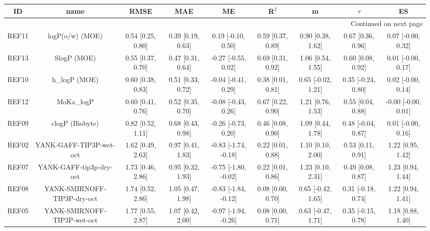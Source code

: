\documentclass{article}
\begin{document}
\begin{center}
\scriptsize
\begin{longtable}{|ccccccccc|}
\toprule
    ID &                            name &               RMSE &                MAE &                    ME &              R$^2$ &                   m &              $\tau$ &                   ES \\
\midrule
\endhead
\midrule
\multicolumn{9}{r}{{Continued on next page}} \\
\midrule
\endfoot

\bottomrule
\endlastfoot
 REF11 &                 logP(o/w) (MOE) &  0.54 [0.25, 0.80] &  0.39 [0.19, 0.63] &    0.19 [-0.10, 0.50] &  0.59 [0.37, 0.89] &   0.90 [0.38, 1.62] &   0.67 [0.36, 0.96] &   0.07 [-0.00, 0.32] \\
 REF13 &                     SlogP (MOE) &  0.55 [0.37, 0.70] &  0.47 [0.31, 0.64] &   -0.27 [-0.55, 0.02] &  0.69 [0.31, 0.92] &   1.06 [0.54, 1.55] &   0.60 [0.08, 0.92] &   0.01 [-0.00, 0.17] \\
 REF10 &                   h\_logP (MOE) &  0.60 [0.38, 0.83] &  0.51 [0.33, 0.72] &   -0.04 [-0.41, 0.29] &  0.38 [0.01, 0.81] &  0.65 [-0.02, 1.21] &  0.35 [-0.24, 0.80] &   0.02 [-0.00, 0.14] \\
 REF12 &                      MoKa\_logP &  0.60 [0.41, 0.76] &  0.52 [0.35, 0.70] &   -0.08 [-0.43, 0.26] &  0.67 [0.22, 0.90] &   1.21 [0.76, 1.53] &   0.55 [0.04, 0.88] &  -0.00 [-0.00, 0.01] \\
 REF09 &                 clogP (Biobyte) &  0.82 [0.52, 1.11] &  0.68 [0.43, 0.98] &   -0.26 [-0.73, 0.20] &  0.46 [0.08, 0.90] &   1.09 [0.44, 1.78] &  0.48 [-0.04, 0.87] &   0.01 [-0.00, 0.16] \\
 REF02 &         YANK-GAFF-TIP3P-wet-oct &  1.62 [0.49, 2.63] &  0.97 [0.41, 1.83] &  -0.83 [-1.74, -0.18] &  0.22 [0.01, 0.88] &   1.10 [0.10, 2.00] &   0.53 [0.11, 0.91] &    1.22 [0.95, 1.42] \\
 REF07 &         YANK-GAFF-tip3p-dry-oct &  1.73 [0.46, 2.86] &  0.95 [0.32, 1.93] &  -0.75 [-1.80, -0.02] &  0.22 [0.01, 0.86] &   1.23 [0.10, 2.31] &   0.49 [0.08, 0.87] &    1.23 [0.94, 1.44] \\
 REF08 &     YANK-SMIRNOFF-TIP3P-dry-oct &  1.74 [0.52, 2.86] &  1.05 [0.47, 1.98] &  -0.83 [-1.84, -0.12] &  0.08 [0.00, 0.70] &  0.65 [-0.42, 1.65] &  0.31 [-0.18, 0.74] &    1.22 [0.94, 1.41] \\
 REF05 &     YANK-SMIRNOFF-TIP3P-wet-oct &  1.77 [0.55, 2.87] &  1.07 [0.42, 2.00] &  -0.97 [-1.94, -0.26] &  0.08 [0.00, 0.71] &  0.63 [-0.47, 1.71] &  0.35 [-0.15, 0.78] &    1.18 [0.88, 1.40] \\

\end{longtable}
\end{center}
\end{document}
